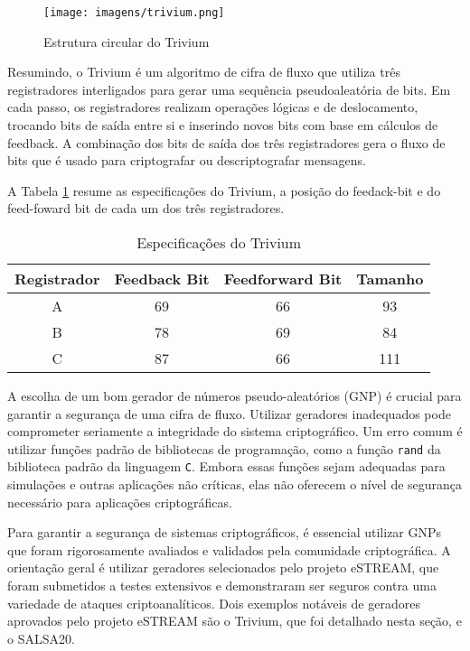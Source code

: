 \begin{figure}
  \centering
  \texttt{[image: imagens/trivium.png]}
  \caption{Estrutura circular do Trivium}
\end{figure}

Resumindo, o Trivium é um algoritmo de cifra de fluxo que utiliza três registradores interligados para gerar uma sequência pseudoaleatória de bits.
Em cada passo, os registradores realizam operações lógicas e de deslocamento, trocando bits de saída entre si e inserindo novos bits com base em cálculos de feedback.
A combinação dos bits de saída dos três registradores gera o fluxo de bits que é usado para criptografar ou descriptografar mensagens.

A Tabela \ref{tab:trivium} resume as especificações do Trivium, a posição do feedack-bit e do feed-foward bit de cada um dos três registradores.

\begin{table}[h!]
  \label{tab:trivium}
\centering
\begin{tabular}{|c|c|c|c|}
\hline
\textbf{Registrador} & \textbf{Feedback Bit} & \textbf{Feedforward Bit} & \textbf{Tamanho} \\
\hline
A & 69 & 66 & 93 \\
\hline
B & 78 & 69 & 84 \\
\hline
C & 87 & 66 & 111 \\
\hline
\end{tabular}
\caption{Especificações do Trivium}
\end{table}

A escolha de um bom gerador de números pseudo-aleatórios (GNP) é crucial para garantir a segurança de uma cifra de fluxo.
Utilizar geradores inadequados pode comprometer seriamente a integridade do sistema criptográfico.
Um erro comum é utilizar funções padrão de bibliotecas de programação, como a função \texttt{rand} da biblioteca padrão da linguagem \texttt{C}.
Embora essas funções sejam adequadas para simulações e outras aplicações não críticas, elas não oferecem o nível de segurança necessário para aplicações criptográficas.

Para garantir a segurança de sistemas criptográficos, é essencial utilizar GNPs que foram rigorosamente avaliados e validados pela comunidade criptográfica.
A orientação geral é utilizar geradores selecionados pelo projeto eSTREAM, que foram submetidos a testes extensivos e demonstraram ser seguros contra uma variedade de ataques criptoanalíticos.
Dois exemplos notáveis de geradores aprovados pelo projeto eSTREAM são o Trivium, que foi detalhado nesta seção, e o SALSA20.


